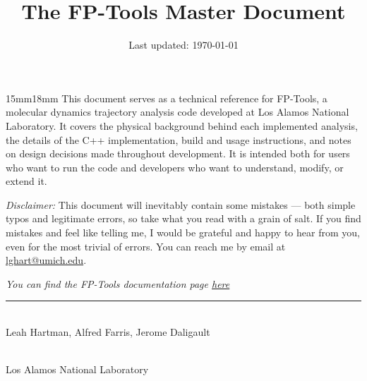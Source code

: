 
\date{}




\title{The FP-Tools Master Document\vspace{-2.5em}}

\maketitle
\thispagestyle{empty}

\begin{adjustwidth}{15mm}{18mm}
\hspace{1.4em} This document serves as a technical reference for FP-Tools, a
molecular dynamics trajectory analysis code developed at Los Alamos National
Laboratory. It covers the physical background behind each implemented analysis, 
the details of the C++ implementation, build and usage instructions, and notes
on design decisions made throughout development. It is intended both for users
who want to run the code and developers who want to understand, modify, or
extend it.

\hspace{1.4em}\textit{Disclaimer:} This document will inevitably contain some 
mistakes ---  both simple typos and legitimate errors, so take what you read
with a grain of salt. If you find mistakes and feel like telling me, I would be
grateful and happy to hear from you, even for the most trivial of errors. You 
can reach me by email at \href{mailto:lghart@umich.edu}{lghart@umich.edu}.
\end{adjustwidth}
\vspace{10.5cm}
\begin{center}
        \textit{You can find the FP-Tools documentation page \href{https://leahghartman.github.io/academics/}{here}}
        \rule{0.75\textwidth}{0.5pt} \\
        Leah Hartman, Alfred Farris, Jerome Daligault \\
        \date{\normalsize Last updated: \today} \\
        Los Alamos National Laboratory
\end{center}

\newpage
\tableofcontents\label{sec:contents}












\appendix



